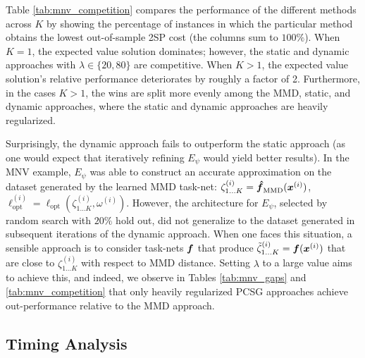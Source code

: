 Table \ref{tab:mnv_competition} compares the performance of the different methods across $K$ by showing the percentage of instances in which the particular method obtains the lowest out-of-sample 2SP cost (the columns sum to $100\%$). When $K=1$, the expected value solution dominates; however, the static and dynamic approaches with $\lambda \in \{20, 80\}$ are competitive. 
When $K > 1$, the expected value solution's relative performance deteriorates by roughly a factor of 2. Furthermore, in the cases $K > 1$, the wins are split more evenly among the MMD, static, and dynamic approaches, where the static and dynamic approaches are heavily regularized. 



Surprisingly, the dynamic approach fails to outperform the static approach (as one would expect that iteratively refining $E_{\psi}$ would yield better results). In the MNV example, $E_{\psi}$ was able to construct an accurate approximation on the dataset generated by the learned MMD task-net: $\zeta_{1 \hdots K}^{(i)} = \boldsymbol{\hat{f}}_{\text{MMD}}(\boldsymbol{x}^{(i)})$, $\ell_{\text{opt}}^{(i)} = \ell_{\text{opt}}(\zeta_{1 \hdots K}^{(i)}, \omega^{(i)})$. However, the architecture for $E_{\psi}$, selected by random search with $20\%$ hold out, did not generalize to the dataset generated in subsequent iterations of the dynamic approach. When one faces this situation, a sensible approach is to consider task-nets $\boldsymbol{f}$ that produce $\tilde{\zeta}_{1 \hdots K}^{(i)} = \boldsymbol{f}(\boldsymbol{x}^{(i)})$ that are close to $\zeta_{1 \hdots K}^{(i)}$ with respect to MMD distance. Setting $\lambda$ to a large value aims to achieve this, and indeed, we observe in Tables \ref{tab:mnv_gaps} and \ref{tab:mnv_competition} that only heavily regularized PCSG approaches achieve out-performance relative to the MMD approach. 


\subsection{Timing Analysis}

